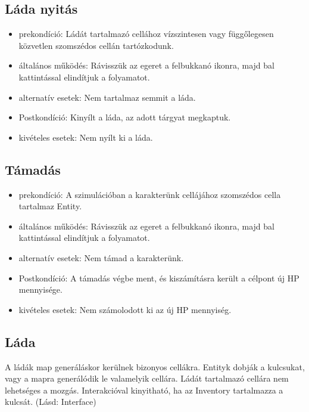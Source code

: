 \subsection{Láda nyitás}

\begin{itemize}
    \item prekondíció: Ládát tartalmazó cellához vízszintesen vagy függőlegesen közvetlen szomszédos cellán tartózkodunk.
    \item általános működés: Rávisszük az egeret a felbukkanó ikonra, majd bal kattintással elindítjuk a folyamatot.
    \item alternatív esetek: Nem tartalmaz semmit a láda.
    \item Postkondíció: Kinyílt a láda, az adott tárgyat megkaptuk.
    \item kivételes esetek: Nem nyílt ki a láda.
\end{itemize}

\subsection{Támadás}

\begin{itemize}
    \item prekondíció: A szimulációban a karakterünk cellájához szomszédos cella tartalmaz Entity.
    \item általános működés: Rávisszük az egeret a felbukkanó ikonra, majd bal kattintással elindítjuk a folyamatot.
    \item alternatív esetek: Nem támad a karakterünk.
    \item Postkondíció: A támadás végbe ment, és kiszámításra került a célpont új HP mennyisége.
    \item kivételes esetek: Nem számolodott ki az új HP mennyiség.
\end{itemize}


\subsection{Láda}

A ládák map generáláskor kerülnek bizonyos cellákra.
Entityk dobják a kulcsukat, vagy a mapra generálódik le valamelyik cellára.
Ládát tartalmazó cellára nem lehetséges a mozgás.
Interakcióval kinyitható, ha az Inventory tartalmazza a kulcsát. (Lásd: Interface)


